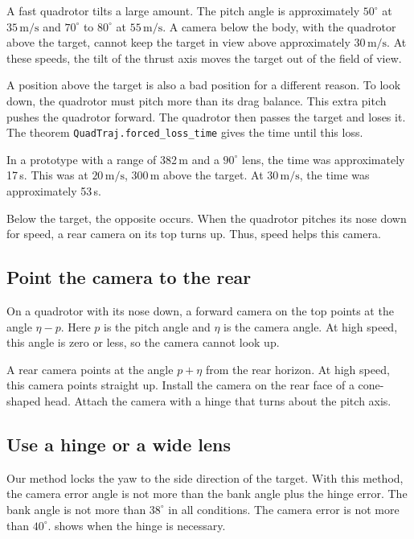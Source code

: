 \documentclass[11pt]{article}
\newcommand{\lean}[1]{\texttt{\small #1}}
\newcommand{\ms}{\,\mathrm{m/s}}
\begin{document}
A fast quadrotor tilts a large amount.
The pitch angle is approximately $50^\circ$ at $35\ms$ and $70^\circ$ to $80^\circ$ at $55\ms$.
A camera below the body, with the quadrotor above the target, cannot keep the target in view
above approximately $30\ms$.
At these speeds, the tilt of the thrust axis moves the target out of the field of view.

A position above the target is also a bad position for a different reason.
To look down, the quadrotor must pitch more than its drag balance.
This extra pitch pushes the quadrotor forward.
The quadrotor then passes the target and loses it.
The theorem \lean{QuadTraj.forced\_loss\_time} gives the time until this loss.

In a prototype with a range of 382\,m and a $90^\circ$ lens, the time was approximately 17\,s.
This was at $20\ms$, 300\,m above the target.
At $30\ms$, the time was approximately 53\,s.

Below the target, the opposite occurs.
When the quadrotor pitches its nose down for speed, a rear camera on its top turns up.
Thus, speed helps this camera.

\subsection{Point the camera to the rear}

On a quadrotor with its nose down, a forward camera on the top points at the angle $\eta - p$.
Here $p$ is the pitch angle and $\eta$ is the camera angle.
At high speed, this angle is zero or less, so the camera cannot look up.

A rear camera points at the angle $p + \eta$ from the rear horizon.
At high speed, this camera points straight up.
Install the camera on the rear face of a cone-shaped head.
Attach the camera with a hinge that turns about the pitch axis.

\subsection{Use a hinge or a wide lens}

Our method locks the yaw to the side direction of the target.
With this method, the camera error angle is not more than the bank angle plus the hinge error.
The bank angle is not more than $38^\circ$ in all conditions.
The camera error is not more than $40^\circ$.
 shows when the hinge is necessary.
\end{document}
